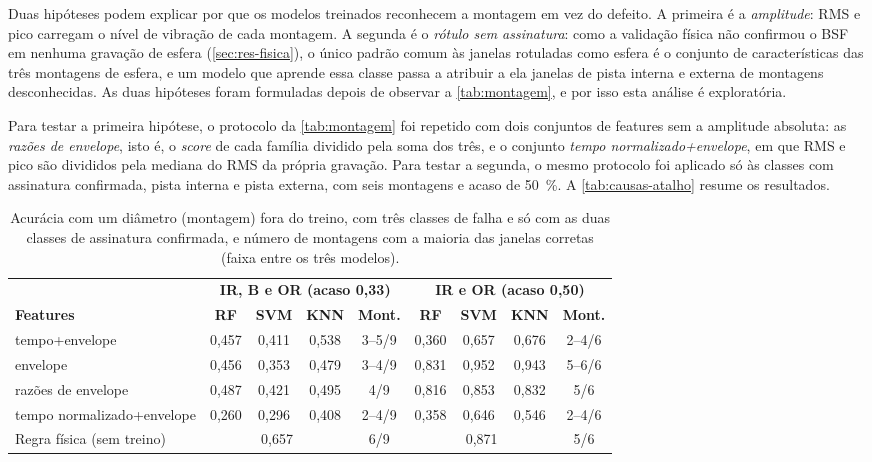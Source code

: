 Duas hipóteses podem explicar por que os modelos treinados reconhecem a montagem
em vez do defeito. A primeira é a \emph{amplitude}: RMS e pico carregam o nível
de vibração de cada montagem. A segunda é o \emph{rótulo sem assinatura}: como a
validação física não confirmou o BSF em nenhuma gravação de esfera
(\autoref{sec:res-fisica}), o único padrão comum às janelas rotuladas como esfera
é o conjunto de características das três montagens de esfera, e um modelo que
aprende essa classe passa a atribuir a ela janelas de pista interna e externa de
montagens desconhecidas. As duas hipóteses foram formuladas depois de observar a
\autoref{tab:montagem}, e por isso esta análise é exploratória.

Para testar a primeira hipótese, o protocolo da \autoref{tab:montagem} foi
repetido com dois conjuntos de features sem a amplitude absoluta: as
\emph{razões de envelope}, isto é, o \emph{score} de cada família dividido pela
soma dos três, e o conjunto \emph{tempo normalizado+envelope}, em que RMS e pico
são divididos pela mediana do RMS da própria gravação. Para testar a segunda, o
mesmo protocolo foi aplicado só às classes com assinatura confirmada, pista
interna e pista externa, com seis montagens e acaso de \SI{50}{\percent}. A
\autoref{tab:causas-atalho} resume os resultados.

\begin{table}[htb]
  \centering
  \caption{Acurácia com um diâmetro (montagem) fora do treino, com três classes
  de falha e só com as duas classes de assinatura confirmada, e número de
  montagens com a maioria das janelas corretas (faixa entre os três modelos).}
  \label{tab:causas-atalho}
  \scriptsize
  \begin{tabular}{lcccccccc}
    \toprule
    & \multicolumn{4}{c}{\textbf{IR, B e OR (acaso 0,33)}} &
      \multicolumn{4}{c}{\textbf{IR e OR (acaso 0,50)}} \\
    \cmidrule(lr){2-5}\cmidrule(lr){6-9}
    \textbf{Features} & \textbf{RF} & \textbf{SVM} & \textbf{KNN} & \textbf{Mont.} &
      \textbf{RF} & \textbf{SVM} & \textbf{KNN} & \textbf{Mont.} \\
    \midrule
    tempo+envelope             & 0,457 & 0,411 & 0,538 & 3--5/9 & 0,360 & 0,657 & 0,676 & 2--4/6 \\
    envelope                   & 0,456 & 0,353 & 0,479 & 3--4/9 & 0,831 & 0,952 & 0,943 & 5--6/6 \\
    razões de envelope         & 0,487 & 0,421 & 0,495 & 4/9    & 0,816 & 0,853 & 0,832 & 5/6 \\
    tempo normalizado+envelope & 0,260 & 0,296 & 0,408 & 2--4/9 & 0,358 & 0,646 & 0,546 & 2--4/6 \\
    \midrule
    Regra física (sem treino)  & \multicolumn{3}{c}{0,657} & 6/9 & \multicolumn{3}{c}{0,871} & 5/6 \\
    \bottomrule
  \end{tabular}
\end{table}

